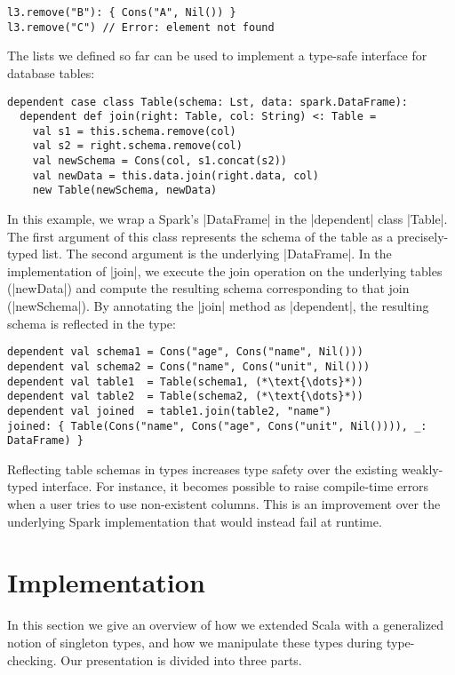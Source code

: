\begin{lstlisting}
l3.remove("B"): { Cons("A", Nil()) }
l3.remove("C") // Error: element not found
\end{lstlisting}

The lists we defined so far can be used to implement a type-safe interface for database tables:

\begin{lstlisting}
dependent case class Table(schema: Lst, data: spark.DataFrame):
  dependent def join(right: Table, col: String) <: Table =
    val s1 = this.schema.remove(col)
    val s2 = right.schema.remove(col)
    val newSchema = Cons(col, s1.concat(s2))
    val newData = this.data.join(right.data, col)
    new Table(newSchema, newData)
\end{lstlisting}

\noindent
In this example, we wrap a Spark's |DataFrame| in the |dependent| class |Table|.
The first argument of this class represents the schema of the table as a precisely-typed list.
The second argument is the underlying |DataFrame|.
In the implementation of |join|, we execute the join operation on the underlying tables (|newData|) and compute the resulting schema corresponding to that join (|newSchema|).
By annotating the |join| method as |dependent|, the resulting schema is reflected in the type:

\begin{lstlisting}
dependent val schema1 = Cons("age", Cons("name", Nil()))
dependent val schema2 = Cons("name", Cons("unit", Nil()))
dependent val table1  = Table(schema1, (*\text{\dots}*))
dependent val table2  = Table(schema2, (*\text{\dots}*))
dependent val joined  = table1.join(table2, "name")
joined: { Table(Cons("name", Cons("age", Cons("unit", Nil()))), _: DataFrame) }
\end{lstlisting}

\noindent
Reflecting table schemas in types increases type safety over the existing weakly-typed interface.
For instance, it becomes possible to raise compile-time errors when a user tries to use non-existent columns.
This is an improvement over the underlying Spark implementation that would instead fail at runtime.

\section{Implementation}
\label{sec:extending-scala}

In this section we give an overview of how we extended Scala with a generalized notion of singleton types, and how we manipulate these types during type-checking.
Our presentation is divided into three parts.

